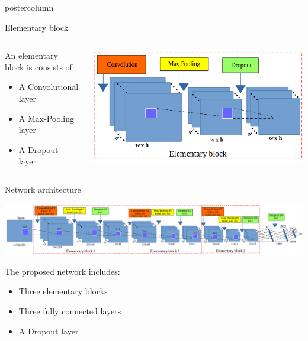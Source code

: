 \begin{frame}
\begin{columns}
\begin{column}{.49\textwidth}
\begin{beamercolorbox}[center,wd=\textwidth]{postercolumn}
\begin{minipage}[T]{.95\textwidth}
{            \begin{block}{Elementary block}
            	\begin{columns}
            		\begin{column}{.54\textwidth}
            			An elementary block is consists of:
            			\begin{itemize}
            				\item A Convolutional layer
            				\item A Max-Pooling layer
            				\item A Dropout layer
            			\end{itemize}
            		\end{column}
            		\begin{column}{.45\textwidth}
            			\centering
            			\includegraphics[width=.97\textwidth]{images/elementary_block.png}
            		\end{column}
            	\end{columns}
            \end{block}
            
            \vfill
            
            \begin{block}{Network architecture}
            	\begin{center}
            		\includegraphics[width=.96\textwidth]{images/net3.png}\\
            	\end{center}
            The proposed network includes:
            \begin{itemize}
            	\item Three elementary blocks
            	\item Three fully connected layers
            	\item A Dropout layer
            \end{itemize}
            \end{block}
  
}
\end{minipage}
\end{beamercolorbox}
\end{column}
\end{columns}
\end{frame}
